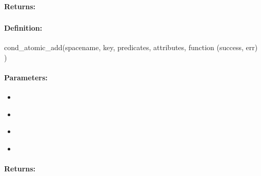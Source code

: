 \paragraph{Returns:}


\pagebreak
\subsubsection{}
\label{api:nodejs:cond_atomic_add}


\paragraph{Definition:}
\begin{javascriptcode}
cond_atomic_add(spacename, key, predicates, attributes, function (success, err) {})
\end{javascriptcode}
\paragraph{Parameters:}
\begin{itemize}[noitemsep]
\item {}\\

\item {}\\

\item {}\\

\item {}\\

\end{itemize}

\paragraph{Returns:}


\pagebreak
\subsubsection{}
\label{api:nodejs:group_atomic_add}


